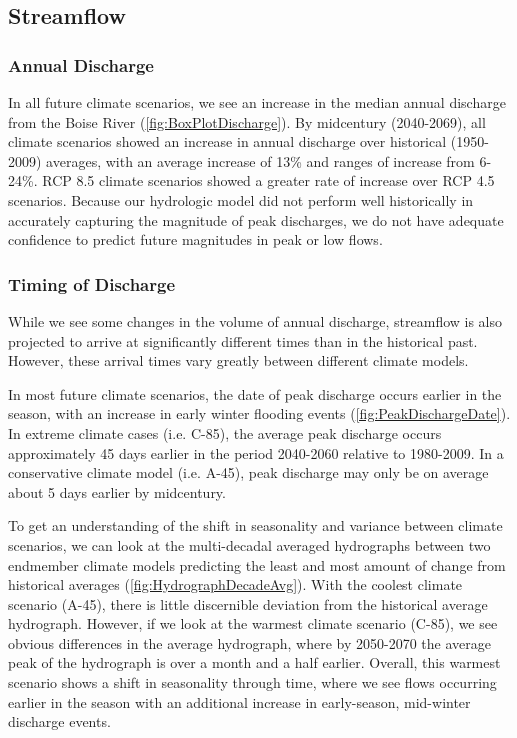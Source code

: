 \documentclass[water,article,submit,moreauthors,pdftex,10pt,a4paper]{mdpi}
\theoremstyle{mdpi}
\newcounter{ex}
\newcounter{re}
\theoremstyle{mdpidefinition}
\begin{document}
\subsection{Streamflow}

\subsubsection{Annual Discharge}

In all future climate scenarios, we see an increase in the median annual discharge from the Boise River (\cref{fig:BoxPlotDischarge}). By midcentury (2040-2069), all climate scenarios showed an increase in annual discharge over historical (1950-2009) averages, with an average increase of 13\% and ranges of increase from 6-24\%. RCP 8.5 climate scenarios showed a greater rate of increase over RCP 4.5 scenarios. Because our hydrologic model did not perform well historically in accurately capturing the magnitude of peak discharges, we do not have adequate confidence to predict future magnitudes in peak or low flows. 

\subsubsection{Timing of Discharge}

While we see some changes in the volume of annual discharge, streamflow is also projected to arrive at significantly different times than in the historical past. However, these arrival times vary greatly between different climate models.

In most future climate scenarios, the date of peak discharge occurs earlier in the season, with an increase in early winter flooding events (\cref{fig:PeakDischargeDate}). In extreme climate cases (i.e. C-85), the average peak discharge occurs approximately 45 days earlier in the period 2040-2060 relative to 1980-2009. In a conservative climate model (i.e. A-45), peak discharge may only be on average about 5 days earlier by midcentury. 

To get an understanding of the shift in seasonality and variance between climate scenarios, we can look at the multi-decadal averaged hydrographs between two endmember climate models predicting the least and most amount of change from historical averages (\cref{fig:HydrographDecadeAvg}). With the coolest climate scenario (A-45), there is little discernible deviation from the historical average hydrograph. However, if we look at the warmest climate scenario (C-85), we see obvious differences in the average hydrograph, where by 2050-2070 the average peak of the hydrograph is over a month and a half earlier. Overall, this warmest scenario shows a shift in seasonality through time, where we see flows occurring earlier in the season with an additional increase in early-season, mid-winter discharge events.
\end{document}
